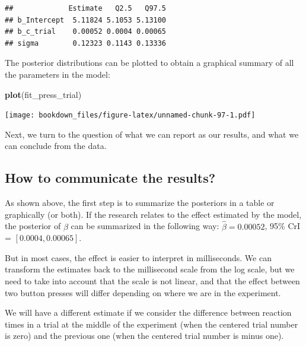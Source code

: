 \documentclass[12pt,]{krantz}
\newenvironment{Shaded}{\begin{snugshade}}{\end{snugshade}}
\newcommand{\KeywordTok}[1]{\textcolor[rgb]{0.13,0.29,0.53}{\textbf{#1}}}
\newcommand{\NormalTok}[1]{#1}
\theoremstyle{definition}
\theoremstyle{definition}
\theoremstyle{definition}
\theoremstyle{remark}
\begin{document}
\begin{verbatim}
##             Estimate   Q2.5   Q97.5
## b_Intercept  5.11824 5.1053 5.13100
## b_c_trial    0.00052 0.0004 0.00065
## sigma        0.12323 0.1143 0.13336
\end{verbatim}

The posterior distributions can be plotted to obtain a graphical summary of all the parameters in the model:

\begin{Shaded}
\begin{Highlighting}[]
\KeywordTok{plot}\NormalTok{(fit_press_trial)}
\end{Highlighting}
\end{Shaded}

\texttt{[image: bookdown\_files/figure-latex/unnamed-chunk-97-1.pdf]}

Next, we turn to the question of what we can report as our results, and what we can conclude from the data.

\hypertarget{how-to-communicate-the-results-1}{%
\subsection{How to communicate the results?}\label{how-to-communicate-the-results-1}}

As shown above, the first step is to summarize the posteriors in a table or graphically (or both). If the research relates to the effect estimated by the model, the posterior of \(\beta\) can be summarized in the following way: \(\hat\beta = 0.00052\), 95\% CrI = \([ 0.0004 , 0.00065 ]\).

But in most cases, the effect is easier to interpret in milliseconds. We can transform the estimates back to the millisecond scale from the log scale, but we need to take into account that the scale is not linear, and that the effect between two button presses will differ depending on where we are in the experiment.

We will have a different estimate if we consider the difference between reaction times in a trial at the middle of the experiment (when the centered trial number is zero) and the previous one (when the centered trial number is minus one).
\end{document}
